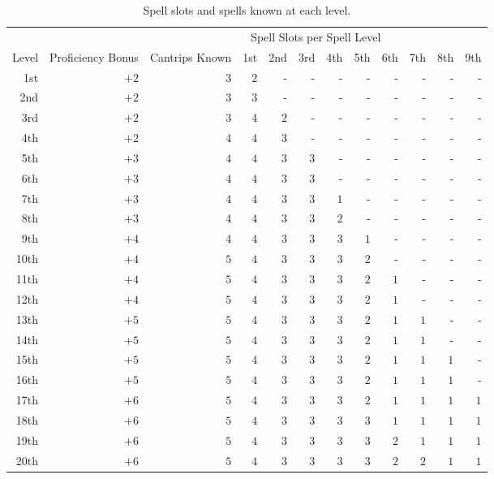 \begin{table}
\center
\begin{tabular}{r | r | r r r r r r r r r r}
\toprule
\multicolumn{2}{c}{} & \multicolumn{10}{c}{Spell Slots per Spell Level} \\
Level & Proficiency Bonus & Cantrips Known & 1st & 2nd & 3rd & 4th & 5th & 6th & 7th & 8th & 9th \\
\midrule
1st  & $+2$ & $3$ & $2$ & - & - & - & - & - & - & - & - \\
2nd  & $+2$ & $3$ & $3$ & - & - & - & - & - & - & - & - \\
3rd  & $+2$ & $3$ & $4$ & $2$ & - & - & - & - & - & - & - \\
4th  & $+2$ & $4$ & $4$ & $3$ & - & - & - & - & - & - & - \\
5th  & $+3$ & $4$ & $4$ & $3$ & $3$ & - & - & - & - & - & - \\
6th  & $+3$ & $4$ & $4$ & $3$ & $3$ & - & - & - & - & - & - \\
7th  & $+3$ & $4$ & $4$ & $3$ & $3$ & $1$ & - & - & - & - & - \\
8th  & $+3$ & $4$ & $4$ & $3$ & $3$ & $2$ & - & - & - & - & - \\
9th  & $+4$ & $4$ & $4$ & $3$ & $3$ & $3$ & $1$ & - & - & - & - \\
10th & $+4$ & $5$ & $4$ & $3$ & $3$ & $3$ & $2$ & - & - & - & - \\
11th & $+4$ & $5$ & $4$ & $3$ & $3$ & $3$ & $2$ & $1$ & - & - & - \\
12th & $+4$ & $5$ & $4$ & $3$ & $3$ & $3$ & $2$ & $1$ & - & - & - \\
13th & $+5$ & $5$ & $4$ & $3$ & $3$ & $3$ & $2$ & $1$ & $1$ & - & - \\
14th & $+5$ & $5$ & $4$ & $3$ & $3$ & $3$ & $2$ & $1$ & $1$ & - & - \\
15th & $+5$ & $5$ & $4$ & $3$ & $3$ & $3$ & $2$ & $1$ & $1$ & $1$ & - \\
16th & $+5$ & $5$ & $4$ & $3$ & $3$ & $3$ & $2$ & $1$ & $1$ & $1$ & - \\
17th & $+6$ & $5$ & $4$ & $3$ & $3$ & $3$ & $2$ & $1$ & $1$ & $1$ & $1$ \\
18th & $+6$ & $5$ & $4$ & $3$ & $3$ & $3$ & $3$ & $1$ & $1$ & $1$ & $1$ \\
19th & $+6$ & $5$ & $4$ & $3$ & $3$ & $3$ & $3$ & $2$ & $1$ & $1$ & $1$ \\
20th & $+6$ & $5$ & $4$ & $3$ & $3$ & $3$ & $3$ & $2$ & $2$ & $1$ & $1$ \\
\bottomrule
\end{tabular}
\label{table:class-spell-slots}
\caption{Spell slots and spells known at each level.}
\end{table}

